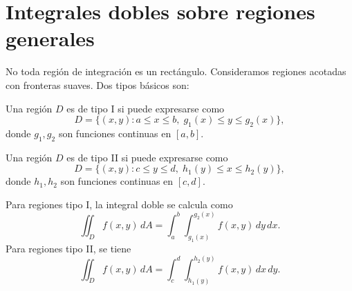 \section{Integrales dobles sobre regiones generales}

No toda región de integración es un rectángulo. Consideramos regiones acotadas con fronteras suaves. Dos tipos básicos son:

\begin{definition}
Una región $D$ es de tipo I si puede expresarse como
\[
D=\{(x,y): a\le x\le b,\; g_1(x)\le y\le g_2(x)\},
\]
donde $g_1,g_2$ son funciones continuas en $[a,b]$.
\end{definition}

\begin{definition}
Una región $D$ es de tipo II si puede expresarse como
\[
D=\{(x,y): c\le y\le d,\; h_1(y)\le x\le h_2(y)\},
\]
donde $h_1,h_2$ son funciones continuas en $[c,d]$.
\end{definition}

Para regiones tipo I, la integral doble se calcula como
\[
\iint_D f(x,y)\,dA = \int_a^b \int_{g_1(x)}^{g_2(x)} f(x,y)\,dy\,dx.
\]
Para regiones tipo II, se tiene
\[
\iint_D f(x,y)\,dA = \int_c^d \int_{h_1(y)}^{h_2(y)} f(x,y)\,dx\,dy.
\]

